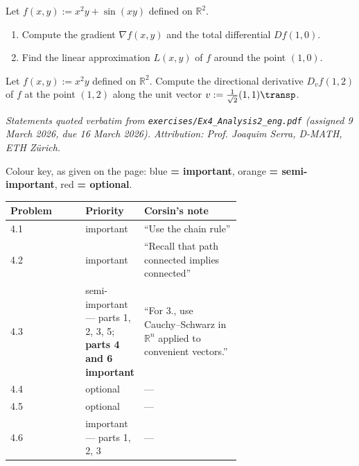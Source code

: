 \begin{aiexercise}
\label{ex:ai_differential_linearization}
Let $f(x,y) := x^2 y + \sin(xy)$ defined on $\mathbb{R}^2$.
\begin{enumerate}[label=\textbf{(\alph*)}]
  \item Compute the gradient $\nabla f(x,y)$ and the total differential $Df(1,0)$.
  \item Find the linear approximation $L(x,y)$ of $f$ around the point $(1,0)$.
\end{enumerate}
\end{aiexercise}

\begin{aiexercise}
\label{ex:ai_directional_derivative}
Let $f(x,y) := x^2 y$ defined on $\mathbb{R}^2$. Compute the directional derivative $D_v f(1,2)$ of $f$ at the point $(1,2)$ along the unit vector $v := \frac{1}{\sqrt{2}}(1,1)\transp$.
\end{aiexercise}


\textit{Statements quoted verbatim from \texttt{exercises/Ex4\_Analysis2\_eng.pdf} (assigned 9
March 2026, due 16 March 2026). Attribution: Prof. Joaquim Serra, D-MATH, ETH Z\"urich.}

\begin{ainote}
Colour key, as given on the page: blue \textbf{= important}, orange \textbf{= semi-important},
red \textbf{= optional}.

\begin{center}
\begin{tabular}{@{}l p{0.24\linewidth} p{0.42\linewidth}@{}}
\textbf{Problem} & \textbf{Priority} & \textbf{Corsin's note} \\
\hline
4.1 & important & ``Use the chain rule'' \\[3pt]
4.2 & important & ``Recall that path connected implies connected'' \\[3pt]
4.3 & semi-important --- parts 1, 2, 3, 5; \textbf{parts 4 and 6 important} &
  ``For 3., use Cauchy--Schwarz in $\mathbb{R}^n$ applied to convenient vectors.'' \\[3pt]
4.4 & optional & --- \\[3pt]
4.5 & optional & --- \\[3pt]
4.6 & important --- parts 1, 2, 3 & --- \\
\end{tabular}
\end{center}
\end{ainote}

